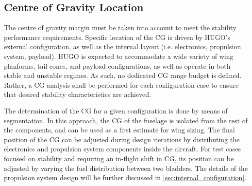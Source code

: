 \subsection{Centre of Gravity Location}
\label{sub:cg_location}
The centre of gravity margin must be taken into account to meet the stability performance requirements. Specific location of the CG is driven by HUGO's external configuration, as well as the internal layout (i.e. electronics, propulsion system, payload). HUGO is expected to accommodate a wide variety of wing planforms, tail cones, and payload configurations, as well as operate in both stable and unstable regimes. As such, no dedicated CG range budget is defined. Rather, a CG analysis shall be performed for each configuration case to ensure that desired stability characteristics are achieved.

The determination of the CG for a given configuration is done by means of segmentation. In this approach, the CG of the fuselage is isolated from the rest of the components, and can be used as a first estimate for wing sizing. The final position of the CG can be adjusted during design iterations by distributing the electronics and propulsion system components inside the aircraft. For test cases focused on stability and requiring an in-flight shift in CG, its position can be adjusted by varying the fuel distribution between two bladders. The details of the propulsion system design will be further discussed in \autoref{sec:internal_configuration}.



